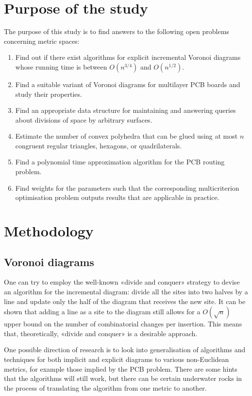 \documentclass[a4paper,11pt]{article}
\begin{document}
\section{Purpose of the study}

	The purpose of this study is to find answers to the following open problems concerning metric spaces:

\begin{enumerate}
	\item Find out if there exist algorithms for explicit incremental Voronoi diagrams whose running time is between \(O(n^{3/4})\) and \(O(n^{1/2})\).
	\item Find a suitable variant of Voronoi diagrams for multilayer PCB boards and study their properties.
	\item Find an appropriate data structure for maintaining and answering queries about divisions of space by arbitrary surfaces.
	\item Estimate the number of convex polyhedra that can be glued using at most \(n\) congruent regular triangles, hexagons, or quadrilaterals.
	\item Find a polynomial time approximation algorithm for the PCB routing problem.
	\item Find weights for the parameters such that the corresponding multicriterion optimisation problem outputs results that are applicable in practice.
\end{enumerate}

\section{Methodology}

\subsection{Voronoi diagrams}

One can try to employ the well-known «divide and conquer» strategy to devise an algorithm for the incremental diagram: divide all the sites into two halves by a line and update only the half of the diagram that receives the new site. It can be shown that adding a line as a site to the diagram still allows for a $O(\sqrt{n})$ upper bound on the number of combinatorial changes per insertion. This means that, theoretically, «divide and conquer» is a desirable approach.

One possible direction of research is to look into generalisation of algorithms and techniques for both implicit and explicit diagrams to various non-Euclidean metrics, for example those implied by the PCB problem. There are some hints that the algorithms will still work, but there can be certain underwater rocks in the process of translating the algorithm from one metric to another.
\end{document}
